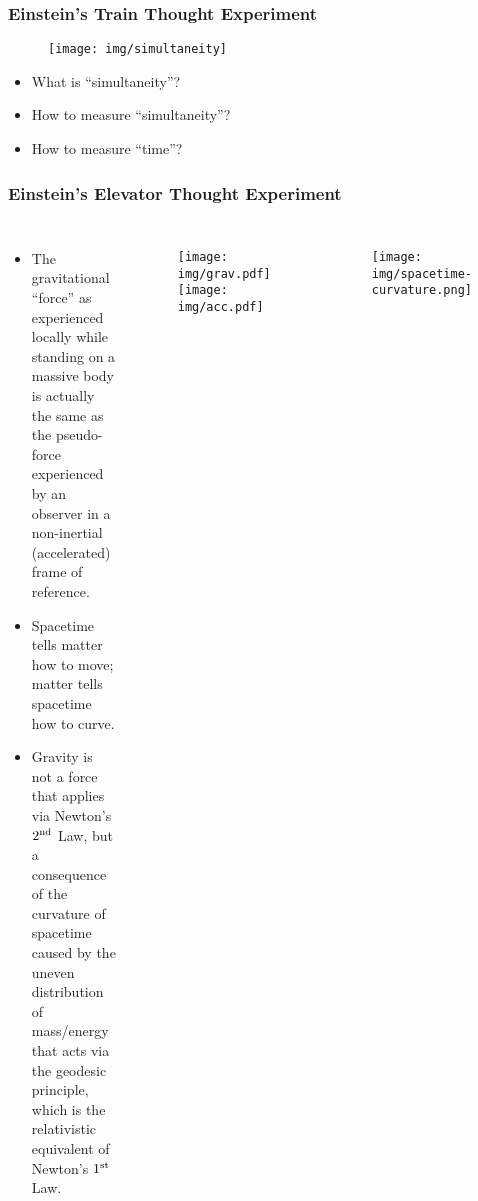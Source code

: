 \documentclass[UTF8,11pt,colorlinks,compress,openany]{beamer}%
\begin{document}
\begin{frame}\frametitle{Einstein's Train Thought Experiment}
\begin{figure}
	\texttt{[image: img/simultaneity]}
\end{figure}
\begin{itemize}
	\item What is ``simultaneity''?
	\item How to measure ``simultaneity''?
	\item How to measure ``time''?
\end{itemize}
\end{frame}

\begin{frame}\frametitle{Einstein's Elevator Thought Experiment}
	\begin{columns}\hspace{-9pt}
			\begin{itemize}
				\item The gravitational ``force'' as experienced locally while standing on a massive body is actually the same as the pseudo-force experienced by an observer in a non-inertial (accelerated) frame of reference.
				\item Spacetime tells matter how to move; matter tells spacetime how to curve.
				\item Gravity is not a force that applies via Newton's $2\textsuperscript{nd}$ Law, but a consequence of the curvature of spacetime caused by the uneven distribution of mass/energy that acts via the geodesic principle, which is the relativistic equivalent of Newton's $1\textsuperscript{st}$ Law.
			\end{itemize}
		\vspace{-5pt}
			\begin{figure}
				\texttt{[image: img/grav.pdf]}
				\texttt{[image: img/acc.pdf]}
			\end{figure}
			\begin{figure}
				\texttt{[image: img/spacetime-curvature.png]}
			\end{figure}
	\end{columns}
\end{frame}
\end{document}
